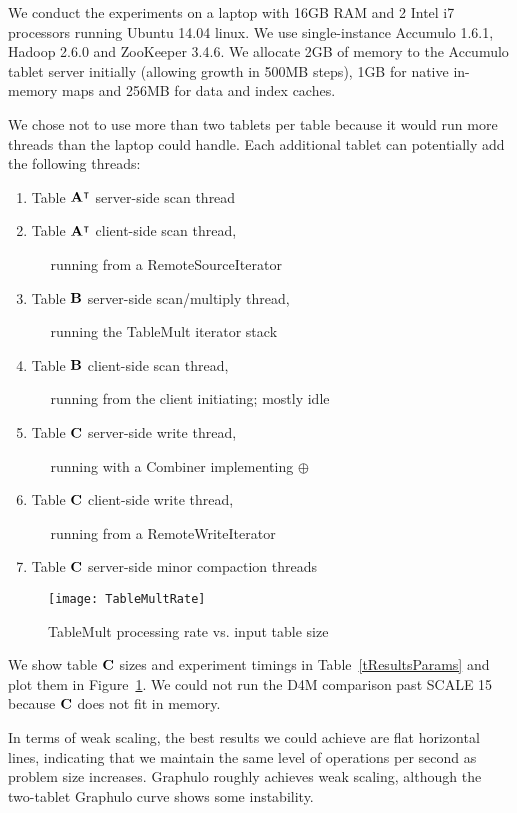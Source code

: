 We conduct the experiments on a laptop with 16GB RAM and 2 Intel i7 processors %
running Ubuntu 14.04 linux. We use single-instance Accumulo 1.6.1, Hadoop 2.6.0 and ZooKeeper 3.4.6.
We allocate 2GB of memory to the Accumulo tablet server initially
(allowing growth in 500MB steps),
1GB for native in-memory maps and 256MB for data and index caches.


We chose not to use more than two tablets per table because it would run more threads
than the laptop could handle.  Each additional tablet can potentially add the following threads:
\begin{enumerate}
\item Table $\mathbf{A}^{\intercal}$ server-side scan thread
\item Table $\mathbf{A}^{\intercal}$ client-side scan thread,

$\quad$ running from a RemoteSourceIterator
\item Table $\mathbf{B}$ server-side scan/multiply thread,

$\quad$ running the TableMult iterator stack
\item Table $\mathbf{B}$ client-side scan thread, 

$\quad$ running from the client initiating; mostly idle
\item Table $\mathbf{C}$ server-side write thread,

$\quad$ running with a Combiner implementing $\oplus$
\item Table $\mathbf{C}$ client-side write thread,

$\quad$ running from a RemoteWriteIterator
\item Table $\mathbf{C}$ server-side minor compaction threads
\end{enumerate}

\begin{figure}[tbh]
\centering
\texttt{[image: TableMultRate]}
\caption{TableMult processing rate vs. input table size}
\label{fTableMultPerf}
\end{figure}

We show table $\mathbf{C}$ sizes and experiment timings in Table~\ref{tResultsParams}
and plot them in Figure~\ref{fTableMultPerf}.
We could not run the D4M comparison past SCALE 15 because $\mathbf{C}$ does not fit in memory.

In terms of weak scaling, the best results we could achieve are flat horizontal lines, 
indicating that we maintain the same level of operations per second as problem size increases.
Graphulo roughly achieves weak scaling, although the two-tablet Graphulo curve 
shows some instability.

